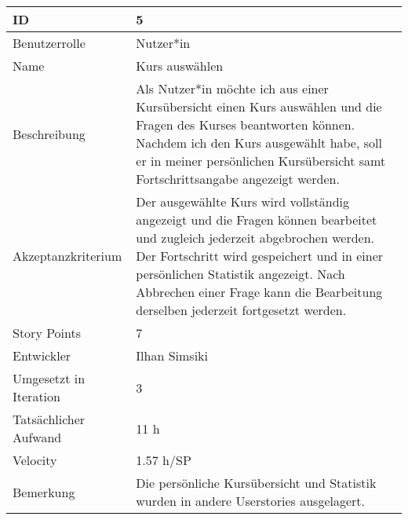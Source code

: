 \begin{tabularx}{\textwidth}{|p{}|X|}
	\hline
	ID & 5\\
	\hline
	Benutzerrolle & Nutzer*in\\
	\hline
	Name & Kurs auswählen\\
	\hline
	Beschreibung & Als Nutzer*in möchte ich aus einer Kursübersicht einen Kurs auswählen und die Fragen des Kurses beantworten können. Nachdem ich den Kurs ausgewählt habe, soll er in meiner persönlichen Kursübersicht samt Fortschrittsangabe angezeigt werden.\\
	\hline
	Akzeptanzkriterium & Der ausgewählte Kurs wird vollständig angezeigt und die Fragen können bearbeitet und zugleich jederzeit abgebrochen werden. Der Fortschritt wird gespeichert und in einer persönlichen Statistik angezeigt. Nach Abbrechen einer Frage kann die Bearbeitung derselben jederzeit fortgesetzt werden.\\
	\hline
	Story Points & 7\\
	\hline
	Entwickler & Ilhan Simsiki\\
	\hline
	Umgesetzt in Iteration & 3\\
	\hline
	Tatsächlicher Aufwand & 11 h\\
	\hline
	Velocity & 1.57 h/SP\\
	\hline
	Bemerkung & Die persönliche Kursübersicht und Statistik wurden in andere Userstories ausgelagert.\\
	\hline
\end{tabularx}
\vspace{20pt}

